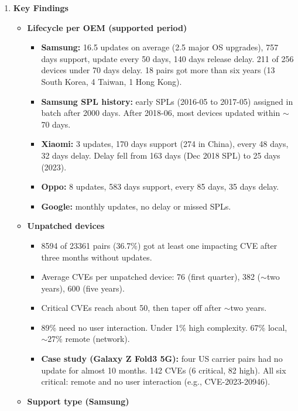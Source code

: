 \documentclass[11pt,a4paper]{article}
\newcommand{\entrypart}[1]{\textbf{\color{accent}#1}\par\vspace{2pt}}
\begin{document}
\begin{enumerate}
    \item \entrypart{Key Findings}

    \begin{itemize}
        \item \textbf{Lifecycle per OEM (supported period)}
        \begin{itemize}
            \item \textbf{Samsung:} 16.5 updates on average (2.5 major OS upgrades), 757 days support, update every 50 days, 140 days release delay. 211 of 256 devices under 70 days delay. 18 pairs got more than six years (13 South Korea, 4 Taiwan, 1 Hong Kong).
            \item \textbf{Samsung SPL history:} early SPLs (2016-05 to 2017-05) assigned in batch after 2000 days. After 2018-06, most devices updated within $\sim$70 days.
            \item \textbf{Xiaomi:} 3 updates, 170 days support (274 in China), every 48 days, 32 days delay. Delay fell from 163 days (Dec 2018 SPL) to 25 days (2023).
            \item \textbf{Oppo:} 8 updates, 583 days support, every 85 days, 35 days delay.
            \item \textbf{Google:} monthly updates, no delay or missed SPLs.
        \end{itemize}
        \item \textbf{Unpatched devices}
        \begin{itemize}
            \item 8594 of 23361 pairs (36.7\%) got at least one impacting CVE after three months without updates.
            \item Average CVEs per unpatched device: 76 (first quarter), 382 ($\sim$two years), 600 (five years).
            \item Critical CVEs reach about 50, then taper off after $\sim$two years.
            \item 89\% need no user interaction. Under 1\% high complexity. 67\% local, $\sim$27\% remote (network).
            \item \textbf{Case study (Galaxy Z Fold3 5G):} four US carrier pairs had no update for almost 10 months. 142 CVEs (6 critical, 82 high). All six critical: remote and no user interaction (e.g., CVE-2023-20946).
        \end{itemize}
        \item \textbf{Support type (Samsung)}
        \begin{itemize}

\end{itemize}
\end{itemize}
\end{enumerate}
\end{document}
